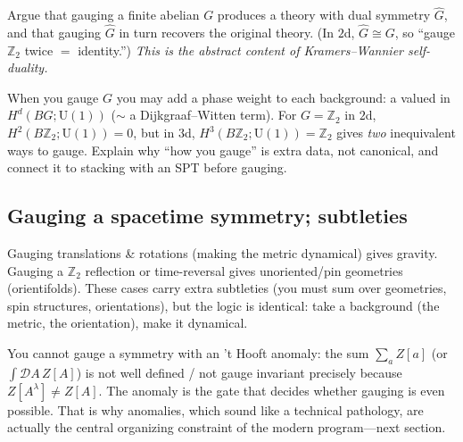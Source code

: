 \documentclass[11pt]{article}
\newcommand{\Uone}{\mathrm{U}(1)}
\newcommand{\Ztwo}{\mathbb{Z}_2}
\begin{document}
\begin{xca}
Argue that gauging a finite abelian $G$ produces a theory with dual symmetry
$\widehat G$, and that gauging $\widehat G$ in turn recovers the original theory. (In
$2$d, $\widehat G\cong G$, so ``gauge $\Ztwo$ twice $=$ identity.'') \emph{This is the
abstract content of Kramers--Wannier self-duality.}
\end{xca}

\begin{xca}
When you gauge $G$ you may add a phase weight to each background: a  valued in $H^d(BG;\Uone)$ ($\sim$ a Dijkgraaf--Witten term). For
$G=\Ztwo$ in $2$d, $H^2(B\Ztwo;\Uone)=0$, but in $3$d, $H^3(B\Ztwo;\Uone)=\Ztwo$ gives
\emph{two} inequivalent ways to gauge. Explain why ``how you gauge'' is extra data, not
canonical, and connect it to stacking with an SPT before gauging.
\end{xca}

\subsection{Gauging a spacetime symmetry; subtleties}

\begin{eexample}
Gauging translations \& rotations (making the metric dynamical) gives gravity. Gauging
a $\Ztwo$ reflection or time-reversal gives unoriented/pin geometries (orientifolds).
These cases carry extra subtleties (you must sum over geometries, spin structures,
orientations), but the logic is identical: take a background (the metric, the
orientation), make it dynamical.
\end{eexample}

\begin{nnote}
You cannot gauge a symmetry with an 't Hooft anomaly: the sum $\sum_a Z[a]$ (or
$\int\mathcal D A\,Z[A]$) is not well defined / not gauge invariant precisely because
$Z[A^\lambda]\neq Z[A]$. The anomaly is the gate that decides whether gauging is even
possible. That is why anomalies, which sound like a technical pathology, are actually
the central organizing constraint of the modern program---next section.
\end{nnote}
\end{document}
